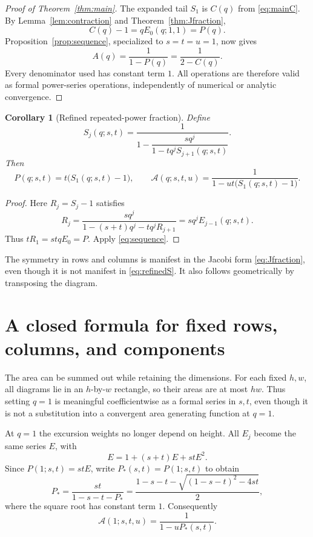 \documentclass[11pt,letterpaper]{article}
\numberwithin{equation}{section}
\newtheorem{corollary}[theorem]{Corollary}
\theoremstyle{definition}
\newcommand{\Aall}{\mathcal A}
\begin{document}
\begin{proof}[Proof of Theorem~\ref{thm:main}]
The expanded tail $S_1$ is $C(q)$ from \eqref{eq:mainC}. By
Lemma~\ref{lem:contraction} and Theorem~\ref{thm:Jfraction},
\[
 C(q)-1=qE_0(q;1,1)=P(q).
\]
Proposition~\ref{prop:sequence}, specialized to $s=t=u=1$, now gives
\[
 A(q)=\frac{1}{1-P(q)}=\frac{1}{2-C(q)}.
\]
Every denominator used has constant term $1$. All operations are therefore
valid as formal power-series operations, independently of numerical or
analytic convergence.
\end{proof}

\begin{corollary}[Refined repeated-power fraction]
\label{cor:refinedS}
Define
\begin{equation}
 S_j(q;s,t)=\frac{1}{1-\dfrac{sq^j}{1-tq^jS_{j+1}(q;s,t)}}.
 \label{eq:refinedS}
\end{equation}
Then
\begin{equation}
 P(q;s,t)=t\bigl(S_1(q;s,t)-1\bigr),\qquad
 \Aall(q;s,t,u)=\frac{1}{1-ut\bigl(S_1(q;s,t)-1\bigr)}.
 \label{eq:refinedSresult}
\end{equation}
\end{corollary}
\begin{proof}
Here $R_j=S_j-1$ satisfies
\[
 R_j=\frac{sq^j}{1-(s+t)q^j-tq^jR_{j+1}}
     =sq^jE_{j-1}(q;s,t).
\]
Thus $tR_1=stqE_0=P$. Apply \eqref{eq:sequence}.
\end{proof}

The symmetry in rows and columns is manifest in the Jacobi form
\eqref{eq:Jfraction}, even though it is not manifest in
\eqref{eq:refinedS}. It also follows geometrically by transposing the
diagram.

\section{A closed formula for fixed rows, columns, and components}
\label{sec:dimensions}

The area can be summed out while retaining the dimensions. For each fixed
$h,w$, all diagrams lie in an $h$-by-$w$ rectangle, so their areas are at
most $hw$. Thus setting $q=1$ is meaningful coefficientwise as a formal
series in $s,t$, even though it is not a substitution into a convergent
area generating function at $q=1$.

At $q=1$ the excursion weights no longer depend on height. All $E_j$ become
the same series $E$, with
\[
 E=1+(s+t)E+stE^2.
\]
Since $P(1;s,t)=stE$, write $P_*(s,t)=P(1;s,t)$ to obtain
\begin{equation}
 P_* =\frac{st}{1-s-t-P_*}
     =\frac{1-s-t-\sqrt{(1-s-t)^2-4st}}{2},
 \label{eq:dimensionGF}
\end{equation}
where the square root has constant term $1$. Consequently
\[
 \Aall(1;s,t,u)=\frac{1}{1-uP_*(s,t)}.
\]
\end{document}
